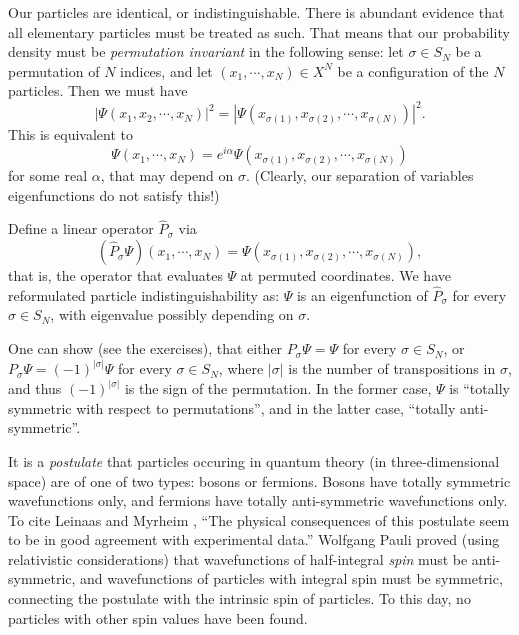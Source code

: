 \documentclass{report}
\theoremstyle{plain}
\theoremstyle{definition}
\begin{document}
Our particles are identical, or indistinguishable. There is abundant
evidence that all elementary particles must be treated as such. That
means that our probability density must be \emph{permutation
  invariant} in the following sense: let $\sigma \in S_N$ be a
permutation of $N$ indices, and let $(x_1,\cdots,x_N)\in X^N$ be a
configuration of the $N$ particles. Then we must have
\begin{equation}
  |\Psi(x_1,x_2,\cdots,x_N)|^2 = |\Psi(x_{\sigma(1)}, x_{\sigma(2)},\cdots,
  x_{\sigma(N)})|^2.
\end{equation}
This is equivalent to
\begin{equation}
  \Psi(x_1,\cdots,x_N) = e^{i\alpha} \Psi(x_{\sigma(1)}, x_{\sigma(2)},\cdots,
  x_{\sigma(N)})
\end{equation}
for some real $\alpha$, that may depend on $\sigma$. (Clearly, our
separation of variables eigenfunctions do not satisfy this!)

Define a linear operator $\hat{P}_\sigma$ via
\begin{equation}
  (\hat{P}_\sigma\Psi)(x_1,\cdots,x_N) = \Psi(x_{\sigma(1)}, x_{\sigma(2)},\cdots,
  x_{\sigma(N)}),
\end{equation}
that is, the operator that evaluates $\Psi$ at permuted
coordinates. We have reformulated particle indistinguishability as:
$\Psi$ is an eigenfunction of $\hat{P}_\sigma$ for every $\sigma\in
S_N$, with eigenvalue possibly depending on $\sigma$.

One can show (see the exercises), that either $P_\sigma \Psi = \Psi$ for every $\sigma\in
S_N$, or $P_\sigma\Psi = (-1)^{|\sigma|}\Psi$ for every $\sigma\in
S_N$, where $|\sigma|$ is the number of transpositions in $\sigma$,
and thus $(-1)^{|\sigma|}$ is the sign of the permutation. In the
former case, $\Psi$ is ``totally symmetric with respect to
permutations'', and in the latter case, ``totally anti-symmetric''.

It is a \emph{postulate} that particles occuring in quantum theory (in
three-dimensional space) are of one of two types: bosons or
fermions. Bosons have totally symmetric wavefunctions only, and
fermions have totally anti-symmetric wavefunctions only. To cite
Leinaas and Myrheim \cite{Leinaas1977}, ``The physical consequences of
this postulate seem to be in good agreement with experimental data.''
Wolfgang Pauli proved (using relativistic considerations) that
wavefunctions of half-integral \emph{spin} must be anti-symmetric, and
wavefunctions of particles with integral spin must be symmetric,
connecting the postulate with the intrinsic spin of particles. To this
day, no particles with other spin values have been found.
\end{document}
